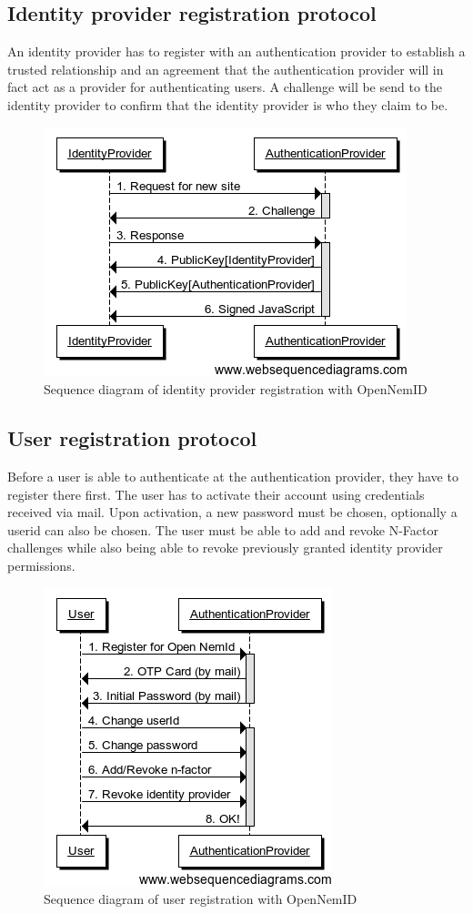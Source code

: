 \documentclass[twosided]{report}
\begin{document}
\subsection{Identity provider registration protocol}
An identity provider has to register with an authentication provider to establish a trusted relationship and an agreement that the authentication provider will in fact act as a provider for authenticating users. A challenge will be send to the identity provider to confirm that the identity provider is who they claim to be.

\begin{figure}[H]
	\centering
	\includegraphics[scale=0.6]{images/Open-NemId-(IdentityProvider-Registration).png}
	\caption{Sequence diagram of identity provider registration with OpenNemID}
\end{figure}

\subsection{User registration protocol}
Before a user is able to authenticate at the authentication provider, they have to register there first. The user has to activate their account using credentials received via mail. Upon activation, a new password must be chosen, optionally a userid can also be chosen. The user must be able to add and revoke N-Factor challenges while also being able to revoke previously granted identity provider permissions.

\begin{figure}[H]
	\centering
	\includegraphics[scale=0.6]{images/Open-NemId-(User-Registration).png}
	\caption{Sequence diagram of user registration with OpenNemID}
\end{figure}
\end{document}
